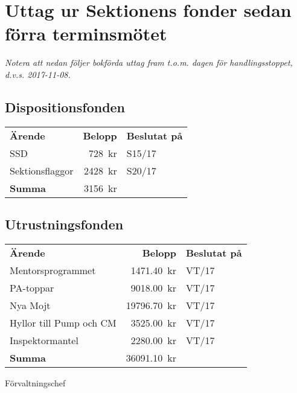 \documentclass[../_main/handlingar.tex]{subfiles}
\begin{document}
\section{Uttag ur Sektionens fonder sedan förra terminsmötet}
\emph{Notera att nedan följer bokförda uttag fram t.o.m. dagen för handlingsstoppet, d.v.s. 2017-11-08.}

\subsection*{Dispositionsfonden}
\begin{tabular}{l r l}
    \textbf{Ärende} & \textbf{Belopp} & \textbf{Beslutat på} \\
    SSD & \SI{728}{kr} & S15/17 \\
    Sektionsflaggor & \SI{2428}{kr} & S20/17 \\
    \hline
    \textbf{Summa} & \SI{3156}{kr} \\
\end{tabular}

\subsection*{Utrustningsfonden}
\begin{tabular}{l r l}
    \textbf{Ärende} & \textbf{Belopp} & \textbf{Beslutat på} \\
    Mentorsprogrammet & \SI{1471.40}{kr} & VT/17 \\
    PA-toppar & \SI{9018.00}{kr} & VT/17 \\
    Nya Mojt & \SI{19796.70}{kr} & VT/17 \\
    Hyllor till Pump och CM & \SI{3525.00}{kr} & VT/17 \\
    Inspektormantel & \SI{2280.00}{kr} & VT/17 \\
    \hline
    \textbf{Summa} & \SI{36091.10}{kr} \\
\end{tabular}

\begin{signatures}{1}
    \ist
    \signature{Sophia Grimmeiss Grahm}{Förvaltningschef}
\end{signatures}
\end{document}

